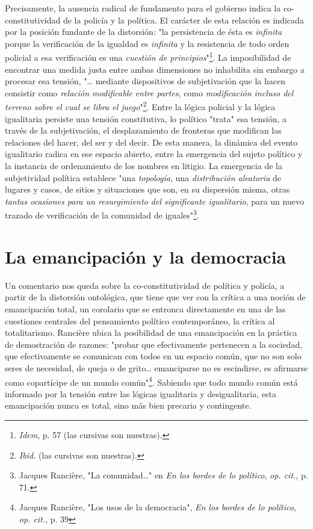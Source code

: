 Precisamente, la ausencia radical de fundamento para el gobierno indica
la co-constitutividad de la policía y la política. El carácter de esta
relación es indicada por la posición fundante de la distorsión: "la
persistencia de ésta es \emph{infinita} porque la verificación de la
igualdad es \emph{infinita} y la resistencia de todo orden policial a
esa verificación es una \emph{cuestión de principios}"\footnote{\emph{Idem},
  p. 57 (las cursivas son nuestras).}. La imposibilidad de encontrar una
medida justa entre ambas dimensiones no inhabilita sin embargo a
procesar esa tensión, "\ldots{} mediante dispositivos de subjetivación
que la hacen consistir como \emph{relación modificable entre partes},
como \emph{modificación incluso del terreno sobre el cual se libra el
juego}"\footnote{\emph{Ibid.} (las cursivas son nuestras).}. Entre la
lógica policial y la lógica igualitaria persiste una tensión
constitutiva, lo político "trata" esa tensión, a través de la
subjetivación, el desplazamiento de fronteras que modifican las
relaciones del hacer, del ser y del decir. De esta manera, la dinámica
del evento igualitario radica en ese espacio abierto, entre la
emergencia del sujeto político y la instancia de ordenamiento de los
nombres en litigio. La emergencia de la subjetividad política establece
"una \emph{topología}, una \emph{distribución aleatoria} de lugares y
casos, de sitios y situaciones que son, en su dispersión misma, otras
\emph{tantas ocasiones para un resurgimiento del significante
igualitario}, para un nuevo trazado de verificación de la comunidad de
iguales"\footnote{Jacques Rancière, "La comunidad\ldots" en \emph{En los
  bordes de lo político}, \emph{op. cit.}, p. 71.}.

\section{La emancipación y la democracia}

Un comentario nos queda sobre la co-constitutividad de política y
policía, a partir de la distorsión ontológica, que tiene que ver con la
crítica a una noción de emancipación total, un corolario que se entronca
directamente en una de las cuestiones centrales del pensamiento político
contemporáneo, la crítica al totalitarismo. Rancière ubica la
posibilidad de una emancipación en la práctica de demostración de
razones: "probar que efectivamente pertenecen a la sociedad, que
efectivamente se comunican con todos en un espacio común, que no son
solo seres de necesidad, de queja o de grito\ldots{} emanciparse no es
escindirse, es afirmarse como copartícipe de un mundo común"\footnote{Jacques
  Rancière, "Los usos de la democracia", \emph{En los bordes de lo
  político}, \emph{op. cit.}, p. 39}. Sabiendo que todo mundo común está
informado por la tensión entre las lógicas igualitaria y desigualitaria,
esta emancipación nunca es total, sino más bien precaria y contingente.

